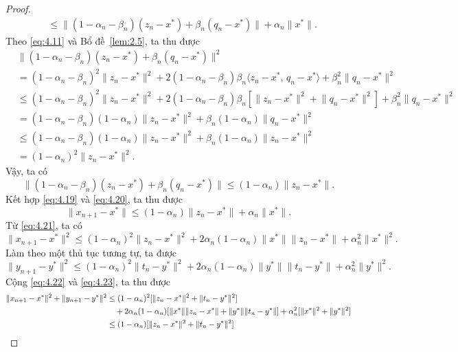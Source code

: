\documentclass[11pt,a4paper]{article}
\theoremstyle{plain}
\theoremstyle{definition}
\theoremstyle{remark}
\numberwithin{equation}{section}
\newcommand{\inp}[2]{\langle #1,\,#2\rangle}
\newcommand{\nm}[1]{\lVert #1\rVert}
\begin{document}
\begin{proof}
\begin{align}
&\le \nm{(1-\alpha_n-\beta_n)(z_n-x^{*})+\beta_n(q_n-x^{*})}+\alpha_n\nm{x^{*}}. \label{eq:4.19}
\end{align}
Theo \eqref{eq:4.11} và Bổ đề~\ref{lem:2.5}, ta thu được
\begin{align*}
&\nm{(1-\alpha_n-\beta_n)(z_n-x^{*})+\beta_n(q_n-x^{*})}^2\\
&= (1-\alpha_n-\beta_n)^2\nm{z_n-x^{*}}^2+2(1-\alpha_n-\beta_n)\beta_n\inp{z_n-x^{*}}{q_n-x^{*}}+\beta_n^2\nm{q_n-x^{*}}^2\\
&\le (1-\alpha_n-\beta_n)^2\nm{z_n-x^{*}}^2+2(1-\alpha_n-\beta_n)\beta_n[\nm{z_n-x^{*}}^2+\nm{q_n-x^{*}}^2]+\beta_n^2\nm{q_n-x^{*}}^2\\
&= (1-\alpha_n-\beta_n)(1-\alpha_n)\nm{z_n-x^{*}}^2+\beta_n(1-\alpha_n)\nm{q_n-x^{*}}^2\\
&\le (1-\alpha_n-\beta_n)(1-\alpha_n)\nm{z_n-x^{*}}^2+\beta_n(1-\alpha_n)\nm{z_n-x^{*}}^2\\
&= (1-\alpha_n)^2\nm{z_n-x^{*}}^2.
\end{align*}
Vậy, ta có
\begin{equation}
\nm{(1-\alpha_n-\beta_n)(z_n-x^{*})+\beta_n(q_n-x^{*})}\le(1-\alpha_n)\nm{z_n-x^{*}}. \label{eq:4.20}
\end{equation}
Kết hợp \eqref{eq:4.19} và \eqref{eq:4.20}, ta thu được
\begin{equation}
\nm{x_{n+1}-x^{*}}\le(1-\alpha_n)\nm{z_n-x^{*}}+\alpha_n\nm{x^{*}}. \label{eq:4.21}
\end{equation}
Từ \eqref{eq:4.21}, ta có
\begin{equation}
\nm{x_{n+1}-x^{*}}^2\le(1-\alpha_n)^2\nm{z_n-x^{*}}^2+2\alpha_n(1-\alpha_n)\nm{x^{*}}\nm{z_n-x^{*}}+\alpha_n^2\nm{x^{*}}^2. \label{eq:4.22}
\end{equation}
Làm theo một thủ tục tương tự, ta được
\begin{equation}
\nm{y_{n+1}-y^{*}}^2\le(1-\alpha_n)^2\nm{t_n-y^{*}}^2+2\alpha_n(1-\alpha_n)\nm{y^{*}}\nm{t_n-y^{*}}+\alpha_n^2\nm{y^{*}}^2. \label{eq:4.23}
\end{equation}
Cộng \eqref{eq:4.22} và \eqref{eq:4.23}, ta thu được
\begin{align}
\nm{x_{n+1}-x^{*}}^2+\nm{y_{n+1}-y^{*}}^2 &\le (1-\alpha_n)^2[\nm{z_n-x^{*}}^2+\nm{t_n-y^{*}}^2]\notag\\
&\quad +2\alpha_n(1-\alpha_n)[\nm{x^{*}}\nm{z_n-x^{*}}+\nm{y^{*}}\nm{t_n-y^{*}}]+\alpha_n^2[\nm{x^{*}}^2+\nm{y^{*}}^2]\notag\\
&\le (1-\alpha_n)[\nm{z_n-x^{*}}^2+\nm{t_n-y^{*}}^2]\notag\\

\end{align}
\end{proof}
\end{document}
